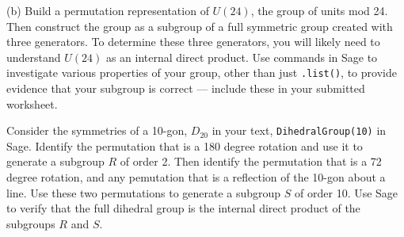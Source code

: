 %
(b) Build a permutation representation of $U(24)$, the group of units mod 24.  Then construct the group as a subgroup of a full symmetric group created with three generators.  To determine these three generators, you will likely need to understand $U(24)$ as an internal direct product.  Use commands in Sage to investigate various properties of your group, other than just \verb?.list()?, to provide evidence that your subgroup is correct --- include these in your submitted worksheet.
\begin{sageverbatim}\end{sageverbatim}
%
%
Consider the symmetries of a 10-gon, $D_{20}$ in your text, \verb?DihedralGroup(10)? in Sage.  Identify the permutation that is a 180 degree rotation and use it to generate a subgroup $R$ of order 2.  Then identify the permutation that is a 72 degree rotation, and any pemutation that is a reflection of the 10-gon about a line.  Use these two permutations to generate a subgroup $S$ of order 10.  Use Sage to verify that the full dihedral group is the internal direct product of the subgroups $R$ and $S$.
\begin{sageverbatim}\end{sageverbatim}
%
